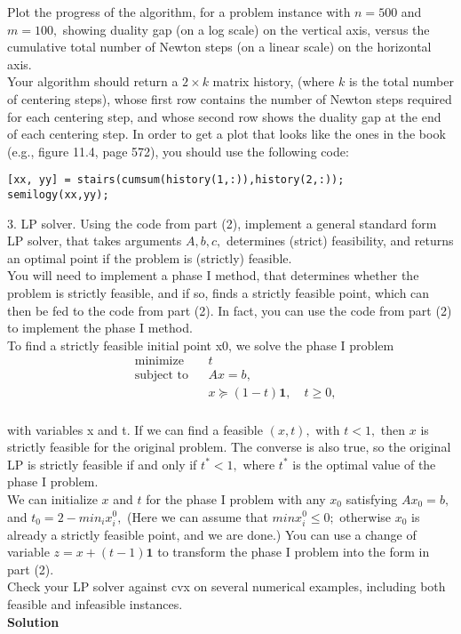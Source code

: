 \documentclass{article}
\begin{document}
Plot the progress of the algorithm, for a problem instance with $n = 500$ and $m = 100,$
showing duality gap (on a log scale) on the vertical axis, versus the cumulative total
number of Newton steps (on a linear scale) on the horizontal axis. \\

Your algorithm should return a $2 \times k$ matrix history, (where $k$ is the total number
of centering steps), whose first row contains the number of Newton steps required
for each centering step, and whose second row shows the duality gap at the end of
each centering step. In order to get a plot that looks like the ones in the book (e.g.,
figure 11.4, page 572), you should use the following code:

\begin{verbatim}
[xx, yy] = stairs(cumsum(history(1,:)),history(2,:));
semilogy(xx,yy);
\end{verbatim}

3. LP solver. Using the code from part (2), implement a general standard form LP
solver, that takes arguments $A, b, c,$ determines (strict) feasibility, and returns an
optimal point if the problem is (strictly) feasible.\\

You will need to implement a phase I method, that determines whether the problem
is strictly feasible, and if so, finds a strictly feasible point, which can then be fed to
the code from part (2). In fact, you can use the code from part (2) to implement the phase I method. \\

To find a strictly feasible initial point x0, we solve the phase I problem
\begin{align*}
	&\text{minimize } && t\\
	&\text{subject to} && Ax = b,\\
	& && x \succeq (1 - t) \mathbf{1}, \quad t \geq 0,\\	
\end{align*}

with variables x and t. If we can find a feasible $(x, t),$ with $t < 1,$ then $x$ is strictly
feasible for the original problem. The converse is also true, so the original LP is strictly
feasible if and only if $t^* < 1,$ where $t^*$ is the optimal value of the phase I problem. \\

We can initialize $x$ and $t$ for the phase I problem with any $x_0$ satisfying $Ax_0 = b,$ and
$t_0 = 2 - min_i x^0_i,$
(Here we can assume that 
$min x^0_i \leq 0;$ otherwise $x_0$ is already a strictly
feasible point, and we are done.) You can use a change of variable $z = x + (t - 1) \mathbf{1}$ to
transform the phase I problem into the form in part (2). \\

Check your LP solver against cvx on several numerical examples, including both feasible and infeasible instances.\\

\textbf{Solution}
\end{document}
